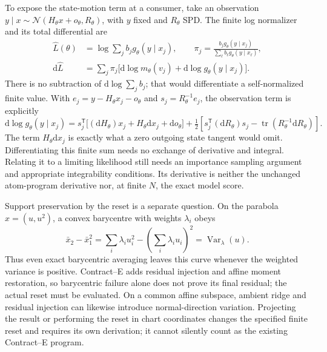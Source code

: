 \documentclass[11pt]{article}
\newcommand{\dd}{\mathrm{d}}
\begin{document}
To expose the state-motion term at a consumer, take an observation
$y\mid x\sim\mathcal N(H_\theta x+o_\theta,R_\theta)$, with $y$ fixed and
$R_\theta$ SPD.  The finite log normalizer and its total differential are
\begin{align}
 \widehat L(\theta)&=\log\sum_j b_j g_\theta(y\mid x_j),\qquad
 \pi_j=\frac{b_jg_\theta(y\mid x_j)}{\sum_\ell b_\ell g_\theta(y\mid x_\ell)},\\
 \dd\widehat L&=\sum_j\pi_j
       \bigl[\dd\log m_\theta(v_j)+\dd\log g_\theta(y\mid x_j)\bigr].
 \label{eq:affine-chart-normalizer}
\end{align}
There is no subtraction of $\dd\log\sum_j b_j$; that would differentiate
a self-normalized finite value.  With
$e_j=y-H_\theta x_j-o_\theta$ and $s_j=R_\theta^{-1}e_j$, the observation
term is explicitly
\begin{equation}
 \dd\log g_\theta(y\mid x_j)
 =s_j^\mathsf{T}\bigl[(\dd H_\theta)x_j
                      +H_\theta\dd x_j+\dd o_\theta\bigr]
 +\tfrac12\left[s_j^\mathsf{T}(\dd R_\theta)s_j
               -\operatorname{tr}(R_\theta^{-1}\dd R_\theta)\right].
 \label{eq:affine-chart-observation}
\end{equation}
The term $H_\theta\dd x_j$ is exactly what a zero outgoing state tangent
would omit.  Differentiating this finite sum needs no exchange of derivative
and integral.  Relating it to a limiting likelihood still needs an importance
sampling argument and appropriate integrability conditions.  Its derivative
is neither the unchanged atom-program derivative nor, at finite $N$, the
exact model score.

Support preservation by the reset is a separate question.  On the parabola
$x=(u,u^2)$, a convex barycentre with weights $\lambda_i$ obeys
\begin{equation}
 \bar x_2-\bar x_1^2
   =\sum_i\lambda_i u_i^2-\left(\sum_i\lambda_i u_i\right)^2
   =\operatorname{Var}_\lambda(u).
 \label{eq:curved-support-barycentre}
\end{equation}
Thus even exact barycentric averaging leaves this curve whenever the weighted
variance is positive.  Contract--E adds residual injection and affine moment
restoration, so barycentric failure alone does not prove its final residual;
the actual reset must be evaluated.  On a common affine subspace, ambient
ridge and residual injection can likewise introduce normal-direction
variation.  Projecting the result or performing the reset in chart
coordinates changes the specified finite reset and requires its own
derivation; it cannot silently count as the existing Contract--E program.
\end{document}

